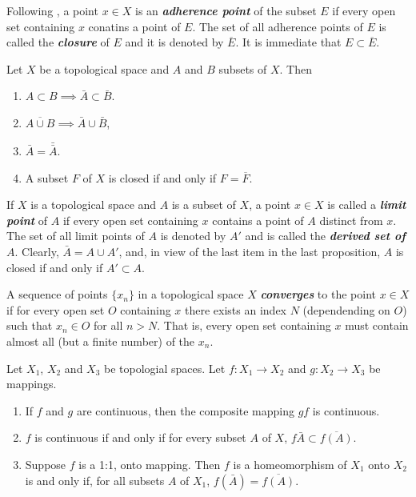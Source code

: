 \documentclass{article}
\theoremstyle{definition}
\numberwithin{equation}{section}
\begin{document}
	
	
	Following \cite{narici}, a point $x\in X$ is an \textbf{\textit{adherence point}} of the subset $E$ if every open set containing $x$ conatins a point of $E$. The set of all adherence points of $E$ is called the \textbf{\textit{closure}} of $E$ and it is denoted by $\overline{E}$. It is immediate that $E\subset\overline{E}$.
	\begin{prop}
		Let $X$ be a topological space and $A$ and $B$ subsets of $X$. Then
		\begin{enumerate}
			\item $A\subset B\implies\bar{A}\subset\bar{B}$.
			\item $\overline{A\cup B}\implies\bar{A}\cup\bar{B}$,
			\item $\bar{A}=\bar{\bar{A}}$.
			\item A subset $F$ of $X$ is closed if and only if $F=\overline{F}$.
		\end{enumerate}
	\end{prop}
	If $X$ is a topological space and $A$ is a subset of $X$, a point $x\in X$ is called a \textbf{\textit{limit point}} of $A$ if every open set containing $x$ contains a point of $A$ distinct from $x$. The set of all limit points of $A$ is denoted by $A'$ and is called the \textbf{\textit{derived set of $A$}}. Clearly, $\bar{A}=A\cup A'$, and, in view of the last item in the last proposition, $A$ is closed if and only if $A'\subset A$.
	
	A sequence of points $\{x_n\}$ in a topological space $X$ \textbf{\textit{converges}} to the point $x\in X$ if for every open set $O$ containing $x$ there exists an index $N$ (dependending on $O$) such that $x_n\in O$ for all $n>N$. That is, every open set containing $x$ must contain almost all (but a finite number) of the $x_n$.
	
	\begin{prop} Let $X_1$, $X_2$ and $X_3$ be topologial spaces. Let $f:X_1\to X_2$ and $g:X_2\to X_3$ be mappings.
		\begin{enumerate} 
			\item If $f$ and $g$ are continuous, then the composite mapping $gf$ is continuous.
			\item $f$ is continuous if and only if for every subset $A$ of $X$, $f\bar{A}\subset\overline{f(A)}$.
			\item Suppose $f$ is a 1:1, onto mapping. Then $f$ is a homeomorphism of $X_1$ onto $X_2$ is and only if, for all subsets $A$ of $X_1$, $f(\bar{A})=\overline{f(A)}$.
		\end{enumerate}
	\end{prop}
	
\end{document}

